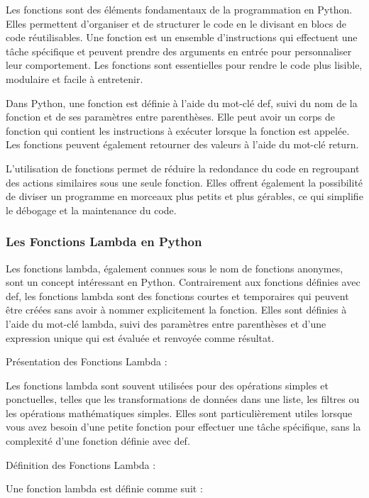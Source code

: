 \documentclass[11pt]{article}
\begin{document}
Les fonctions sont des éléments fondamentaux de la programmation en
Python. Elles permettent d'organiser et de structurer le code en le
divisant en blocs de code réutilisables. Une fonction est un ensemble
d'instructions qui effectuent une tâche spécifique et peuvent prendre
des arguments en entrée pour personnaliser leur comportement. Les
fonctions sont essentielles pour rendre le code plus lisible, modulaire
et facile à entretenir.

Dans Python, une fonction est définie à l'aide du mot-clé def, suivi du
nom de la fonction et de ses paramètres entre parenthèses. Elle peut
avoir un corps de fonction qui contient les instructions à exécuter
lorsque la fonction est appelée. Les fonctions peuvent également
retourner des valeurs à l'aide du mot-clé return.

L'utilisation de fonctions permet de réduire la redondance du code en
regroupant des actions similaires sous une seule fonction. Elles offrent
également la possibilité de diviser un programme en morceaux plus petits
et plus gérables, ce qui simplifie le débogage et la maintenance du
code.

\hypertarget{les-fonctions-lambda-en-python}{%
\subsubsection{Les Fonctions Lambda en
Python}\label{les-fonctions-lambda-en-python}}

Les fonctions lambda, également connues sous le nom de fonctions
anonymes, sont un concept intéressant en Python. Contrairement aux
fonctions définies avec def, les fonctions lambda sont des fonctions
courtes et temporaires qui peuvent être créées sans avoir à nommer
explicitement la fonction. Elles sont définies à l'aide du mot-clé
lambda, suivi des paramètres entre parenthèses et d'une expression
unique qui est évaluée et renvoyée comme résultat.

Présentation des Fonctions Lambda :

Les fonctions lambda sont souvent utilisées pour des opérations simples
et ponctuelles, telles que les transformations de données dans une
liste, les filtres ou les opérations mathématiques simples. Elles sont
particulièrement utiles lorsque vous avez besoin d'une petite fonction
pour effectuer une tâche spécifique, sans la complexité d'une fonction
définie avec def.

Définition des Fonctions Lambda :

Une fonction lambda est définie comme suit :
\end{document}
